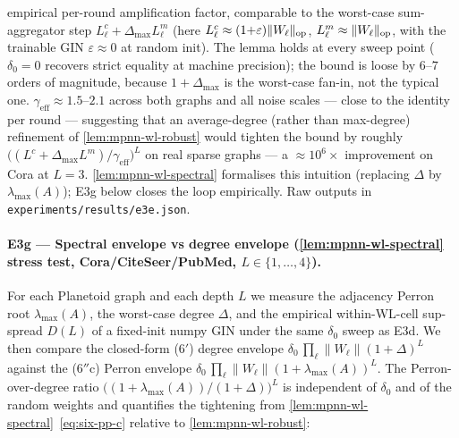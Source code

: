 \documentclass[10pt]{article}
\theoremstyle{definition}
\theoremstyle{remark}
\begin{document}
\begin{table}[h]
{empirical per-round amplification factor, comparable to the
worst-case sum-aggregator step
$L^{c}_{\ell} + \Delta_{\max} L^{m}_{\ell}$ (here
$L^{c}_{\ell} \approx (1{+}\varepsilon)\|W_{\ell}\|_{\rm op}$,
$L^{m}_{\ell} \approx \|W_{\ell}\|_{\rm op}$, with the trainable
GIN $\varepsilon \approx 0$ at random init). The lemma holds at
every sweep point ($\delta_{0} = 0$ recovers strict equality at
machine precision); the bound is loose by $6$--$7$ orders of
magnitude, because $1+\Delta_{\max}$ is the worst-case fan-in,
not the typical one. $\gamma_{\mathrm{eff}} \approx 1.5$--$2.1$
across both graphs and all noise scales --- close to the
identity per round --- suggesting that an
average-degree (rather than max-degree) refinement of
\cref{lem:mpnn-wl-robust} would tighten the bound by roughly
$\bigl((L^{c}{+}\Delta_{\max} L^{m})/\gamma_{\mathrm{eff}}\bigr)^{L}$
on real sparse graphs --- a $\approx 10^{6}\times$ improvement on
Cora at $L=3$. \cref{lem:mpnn-wl-spectral} formalises this
intuition (replacing $\Delta$ by $\lambda_{\max}(A)$); E3g below
closes the loop empirically.
Raw outputs in
\texttt{experiments/results/e3e.json}.}
\label{tab:e3d}
\end{table}

\paragraph{E3g --- Spectral envelope vs degree envelope
(\cref{lem:mpnn-wl-spectral} stress test, Cora/CiteSeer/PubMed,
$L \in \{1,\dots,4\}$).}
For each Planetoid graph and each depth $L$ we measure the
adjacency Perron root $\lambda_{\max}(A)$, the worst-case
degree $\Delta$, and the empirical within-WL-cell sup-spread
$D(L)$ of a fixed-init numpy GIN under the same $\delta_{0}$
sweep as E3d. We then compare the closed-form
(6$'$) degree envelope $\delta_{0}\,\prod_{\ell}\|W_{\ell}\|
(1{+}\Delta)^{L}$ against the (6$''$c) Perron envelope
$\delta_{0}\,\prod_{\ell}\|W_{\ell}\|
(1{+}\lambda_{\max}(A))^{L}$. The Perron-over-degree ratio
$\bigl((1{+}\lambda_{\max}(A))/(1{+}\Delta)\bigr)^{L}$ is
independent of $\delta_{0}$ and of the random weights and
quantifies the tightening from
\cref{lem:mpnn-wl-spectral}~\eqref{eq:six-pp-c} relative to
\cref{lem:mpnn-wl-robust}:
\end{document}
